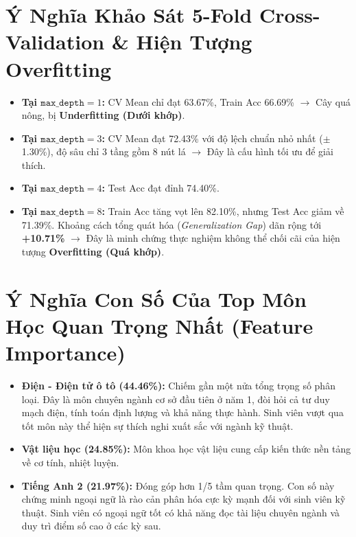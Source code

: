 \documentclass[12pt,a4paper]{article}
\begin{document}
\section{Ý Nghĩa Khảo Sát 5-Fold Cross-Validation \& Hiện Tượng Overfitting}
\begin{itemize}
    \item \textbf{Tại $\texttt{max\_depth} = 1$:} CV Mean chỉ đạt 63.67\%, Train Acc 66.69\% $\rightarrow$ Cây quá nông, bị \textbf{Underfitting (Dưới khớp)}.
    \item \textbf{Tại $\texttt{max\_depth} = 3$:} CV Mean đạt 72.43\% với độ lệch chuẩn nhỏ nhất ($\pm$1.30\%), độ sâu chỉ 3 tầng gồm 8 nút lá $\rightarrow$ Đây là cấu hình tối ưu để giải thích.
    \item \textbf{Tại $\texttt{max\_depth} = 4$:} Test Acc đạt đỉnh 74.40\%.
    \item \textbf{Tại $\texttt{max\_depth} = 8$:} Train Acc tăng vọt lên 82.10\%, nhưng Test Acc giảm về 71.39\%. Khoảng cách tổng quát hóa (\textit{Generalization Gap}) dãn rộng tới \textbf{+10.71\%} $\rightarrow$ Đây là minh chứng thực nghiệm không thể chối cãi của hiện tượng \textbf{Overfitting (Quá khớp)}.
\end{itemize}

\section{Ý Nghĩa Con Số Của Top Môn Học Quan Trọng Nhất (Feature Importance)}
\begin{itemize}
    \item \textbf{Điện - Điện tử ô tô (44.46\%):} Chiếm gần một nửa tổng trọng số phân loại. Đây là môn chuyên ngành cơ sở đầu tiên ở năm 1, đòi hỏi cả tư duy mạch điện, tính toán định lượng và khả năng thực hành. Sinh viên vượt qua tốt môn này thể hiện sự thích nghi xuất sắc với ngành kỹ thuật.
    \item \textbf{Vật liệu học (24.85\%):} Môn khoa học vật liệu cung cấp kiến thức nền tảng về cơ tính, nhiệt luyện.
    \item \textbf{Tiếng Anh 2 (21.97\%):} Đóng góp hơn 1/5 tầm quan trọng. Con số này chứng minh ngoại ngữ là rào cản phân hóa cực kỳ mạnh đối với sinh viên kỹ thuật. Sinh viên có ngoại ngữ tốt có khả năng đọc tài liệu chuyên ngành và duy trì điểm số cao ở các kỳ sau.
\end{itemize}
\end{document}
